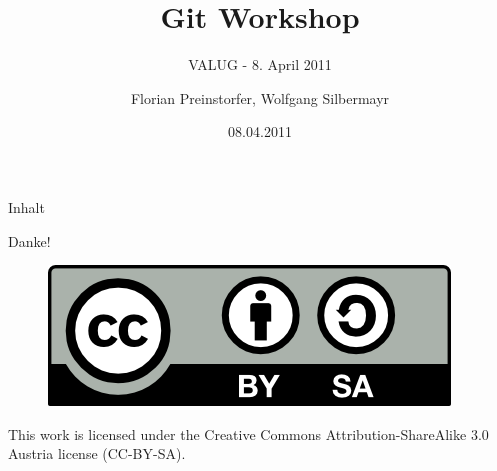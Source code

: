 \documentclass[%
]{beamer}
\title{Git Workshop}
\subtitle{VALUG - 8. April 2011}
\author[Florian Preinstorfer, Wolfgang Silbermayr]{Florian Preinstorfer, Wolfgang Silbermayr}
\date[valug - 08.04.2011]{08.04.2011}
\begin{document}
\frame[plain]{\titlepage}

\begin{frame}{Inhalt}
  \tableofcontents[pausesections]
\end{frame}



\begin{frame}[plain]
  \begin{center}
    \vspace{1cm}
    Danke!
    \vspace{3cm}
    \begin{figure}[!b]
      \includegraphics[scale=0.5]{img/by-sa}
    \end{figure}
    \tiny{This work is licensed under the Creative Commons Attribution-ShareAlike 3.0 Austria license (CC-BY-SA).}
\end{center}
\end{frame}
\end{document}
